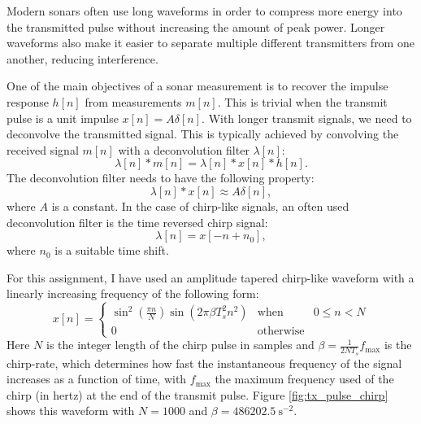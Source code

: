 Modern sonars often use long waveforms in order to compress more
energy into the transmitted pulse without increasing the amount of
peak power. Longer waveforms also make it easier to separate multiple
different transmitters from one another, reducing interference. 

One of the main objectives of a sonar measurement is to recover the impulse
response $h[n]$ from measurements $m[n]$. This is trivial when the
transmit pulse is a unit impulse $x[n]=A\delta[n]$. With longer
transmit signals, we need to deconvolve the transmitted signal. This
is typically achieved by convolving the received signal $m[n]$ with a 
deconvolution filter $\lambda[n]$:
\begin{equation}
  \lambda[n]*m[n] = \lambda[n] * x[n] * h[n].
\end{equation}
The deconvolution filter needs to have the following property:
\begin{equation}
  \lambda[n]*x[n] \approx A\delta[n],
\end{equation}
where $A$ is a constant. In the case of chirp-like signals, an often used 
deconvolution filter is the time reversed chirp signal:
\begin{equation}
  \lambda[n] = x[-n + n_0],
\end{equation}
where $n_0$ is a suitable time shift. 

For this assignment, I have used an amplitude tapered chirp-like
waveform with a linearly increasing frequency of the following form:
\begin{equation}
  x[n] = \left\{
\begin{array}{ccc}
  \sin^2\left(\frac{\pi n}{N}\right) \sin(2\pi \beta T_s^2 n^2) & \mathrm{when} & 0 \le n < N\\
  0 & \mathrm{otherwise} & 
  \end{array}\right.
\end{equation}
Here $N$ is the integer length of the chirp pulse in samples and
$\beta = \frac{1}{2 N T_s}f_{\mathrm{max}}$ is the chirp-rate, which
determines how fast the instantaneous frequency of the signal
increases as a function of time, with $f_{\mathrm{max}}$ the maximum
frequency used of the chirp (in hertz) at the end of the transmit
pulse. Figure \ref{fig:tx_pulse_chirp} shows this waveform with
$N=1000$ and $\beta = 486202.5\ \text{s}^{-2}$.

